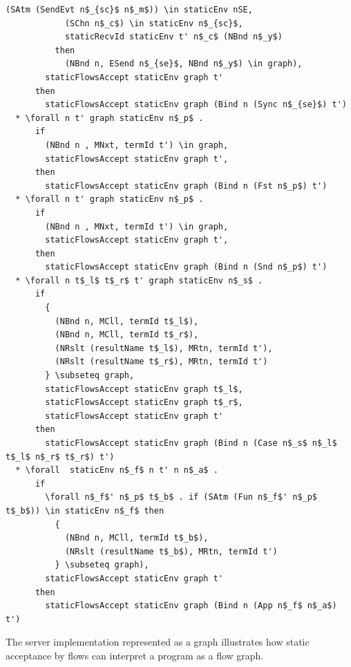 \documentclass[letterpaper, 11pt]{extarticle}
\begin{document}
\begin{lstlisting}[language=logic, mathescape]
            (SAtm (SendEvt n$_{sc}$ n$_m$)) \in staticEnv nSE, 
            (SChn n$_c$) \in staticEnv n$_{sc}$,
            staticRecvId staticEnv t' n$_c$ (NBnd n$_y$)
          then
            (NBnd n, ESend n$_{se}$, NBnd n$_y$) \in graph),
        staticFlowsAccept staticEnv graph t'
      then
        staticFlowsAccept staticEnv graph (Bind n (Sync n$_{se}$) t')
  * \forall n t' graph staticEnv n$_p$ .
      if
        (NBnd n , MNxt, termId t') \in graph,
        staticFlowsAccept staticEnv graph t',
      then
        staticFlowsAccept staticEnv graph (Bind n (Fst n$_p$) t')
  * \forall n t' graph staticEnv n$_p$ .
      if
        (NBnd n , MNxt, termId t') \in graph,
        staticFlowsAccept staticEnv graph t',
      then
        staticFlowsAccept staticEnv graph (Bind n (Snd n$_p$) t')
  * \forall n t$_l$ t$_r$ t' graph staticEnv n$_s$ .
      if
        {
          (NBnd n, MCll, termId t$_l$),
          (NBnd n, MCll, termId t$_r$),
          (NRslt (resultName t$_l$), MRtn, termId t'),
          (NRslt (resultName t$_r$), MRtn, termId t')
        } \subseteq graph,
        staticFlowsAccept staticEnv graph t$_l$,
        staticFlowsAccept staticEnv graph t$_r$,
        staticFlowsAccept staticEnv graph t'
      then
        staticFlowsAccept staticEnv graph (Bind n (Case n$_s$ n$_l$ t$_l$ n$_r$ t$_r$) t')
  * \forall  staticEnv n$_f$ n t' n n$_a$ .
      if
        \forall n$_f$' n$_p$ t$_b$ . if (SAtm (Fun n$_f$' n$_p$ t$_b$)) \in staticEnv n$_f$ then 
          {
            (NBnd n, MCll, termId t$_b$),
            (NRslt (resultName t$_b$), MRtn, termId t')
          } \subseteq graph),
        staticFlowsAccept staticEnv graph t'
      then
        staticFlowsAccept staticEnv graph (Bind n (App n$_f$ n$_a$) t')
\end{lstlisting}

The server implementation represented as a graph illustrates how static acceptance by
flows can interpret a program as a flow graph.
\end{document}
